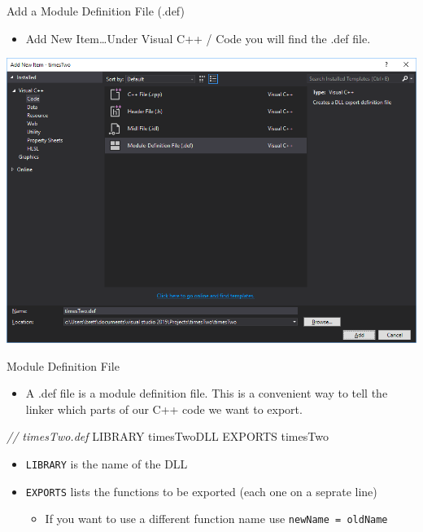 \documentclass[ignorenonframetext,]{beamer}
\newenvironment{Shaded}{\begin{snugshade}}{\end{snugshade}}
\newcommand{\CommentTok}[1]{\textcolor[rgb]{0.56,0.35,0.01}{\textit{{#1}}}}
\newcommand{\NormalTok}[1]{{#1}}
\providecommand{\tightlist}{%
\setlength{\itemsep}{0pt}\setlength{\parskip}{0pt}}
\begin{document}
\begin{frame}{Add a Module Definition File (.def)}

\begin{itemize}
\tightlist
\item
  Add New Item\ldots{}Under Visual C++ / Code you will find the .def
  file.
\end{itemize}

\centerline{
  \includegraphics[width=\textwidth,height=0.7\textheight,keepaspectratio]{./defFile.png}
}

\end{frame}

\begin{frame}[fragile]{Module Definition File}

\begin{itemize}
\tightlist
\item
  A .def file is a module definition file. This is a convenient way to
  tell the linker which parts of our C++ code we want to export.
\end{itemize}

\begin{Shaded}
\begin{Highlighting}[]
\CommentTok{// timesTwo.def}
\NormalTok{LIBRARY timesTwoDLL}
\NormalTok{EXPORTS}
  \NormalTok{timesTwo}
\end{Highlighting}
\end{Shaded}

\begin{itemize}
\tightlist
\item
  \texttt{LIBRARY} is the name of the DLL
\item
  \texttt{EXPORTS} lists the functions to be exported (each one on a
  seprate line)

  \begin{itemize}
  \tightlist
  \item
    If you want to use a different function name use
    \texttt{newName\ =\ oldName}
  \end{itemize}
\end{itemize}

\end{frame}
\end{document}
